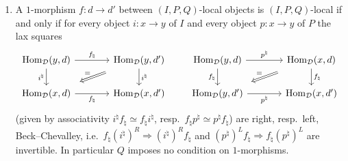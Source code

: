 \begin{thm}
\begin{enumerate}
\begin{equation*}
\begin{tikzcd}[column sep=large]
"b^{\natural}"'] & \Hom_{\D}(x',d) \ar[d, "a^{\natural}"] \ar[dl, Rightarrow,
shorten=4mm] \\
\Hom_{\D}(y,d) \ar[r, "p^{\natural}"'] & \Hom_{\D}(x,d)
\end{tikzcd}
\end{equation*}
filled by $\sigma$, resp.\ $\tau$, are right, resp.\ left, Beck--Chevalley,
i.e.\
$b^{\natural}(i'^{\natural})^{R} \Rightarrow (i^{\natural})^{R}a^{\natural}$
and
$(p^{\natural})^{L}a^{\natural} \Rightarrow b^{\natural}(p'^{\natural})^{L}$
are invertible; and for every $\sigma$ in $Q$ the first square is double
Beck--Chevalley, i.e.\ its double Beck--Chevalley map
\begin{equation*}
(b^{\natural})^{L}(i^{\natural})^{R} \Longrightarrow
(i'^{\natural})^{R}(a^{\natural})^{L}\colon \Hom_{\D}(x,d) \to
\Hom_{\D}(y',d)
\end{equation*}
is invertible.
\item A $1$-morphism $f\colon d \to d'$ between $(I,P,Q)$-local objects is
$(I,P,Q)$-local if and only if for every object $i\colon x \to y$ of $I$ and
every
object $p\colon x \to y$ of $P$ the lax squares
\begin{equation*}
\begin{tikzcd}[column sep=large]
\Hom_{\D}(y,d) \ar[r, "f_{\natural}"] \ar[d,
"i^{\natural}"'] & \Hom_{\D}(y,d') \ar[d, "i^{\natural}"] \ar[dl, Rightarrow,
shorten=4mm, "="'] \\
\Hom_{\D}(x,d) \ar[r, "f_{\natural}"'] & \Hom_{\D}(x,d')
\end{tikzcd}
\qquad
\begin{tikzcd}[column sep=large]
\Hom_{\D}(y,d) \ar[r, "p^{\natural}"] \ar[d,
"f_{\natural}"'] & \Hom_{\D}(x,d) \ar[d, "f_{\natural}"] \ar[dl, Rightarrow,
shorten=4mm, "="'] \\
\Hom_{\D}(y,d') \ar[r, "p^{\natural}"'] & \Hom_{\D}(x,d')
\end{tikzcd}
\end{equation*}
(given by associativity
$i^{\natural}f_{\natural} \simeq f_{\natural}i^{\natural}$,
resp.\
$f_{\natural}p^{\natural} \simeq p^{\natural}f_{\natural}$)
are right, resp.\ left, Beck--Chevalley, i.e.\
$f_{\natural}(i^{\natural})^{R} \Rightarrow (i^{\natural})^{R}f_{\natural}$
and
$(p^{\natural})^{L}f_{\natural} \Rightarrow f_{\natural}(p^{\natural})^{L}$
are invertible. In particular $Q$ imposes no condition on $1$-morphisms.
\end{enumerate}
\end{thm}

